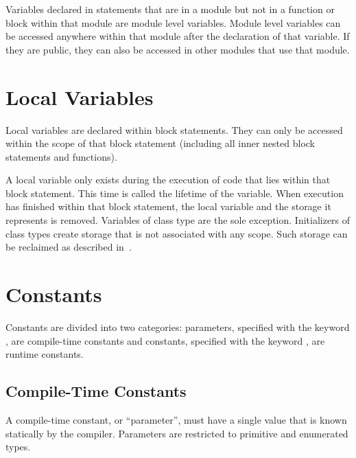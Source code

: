 Variables declared in statements that are in a module but not in a
function or block within that module are module level variables.
Module level variables can be accessed anywhere within that module
after the declaration of that variable.  If they are public, they can
also be accessed in other modules that use that module.

\section{Local Variables}
\label{Local_Variables}

Local variables are declared within block statements.  They can only
be accessed within the scope of that block statement (including all
inner nested block statements and functions).

A local variable only exists during the execution of code that lies
within that block statement.  This time is called the lifetime of the
variable.  When execution has finished within that block statement,
the local variable and the storage it represents is removed.
Variables of class type are the sole exception.  Initializers of class
types create storage that is not associated with any scope.  Such
storage can be reclaimed as described
in~.

\section{Constants}
\label{Constants}

Constants are divided into two categories: parameters, specified with
the keyword , are compile-time constants and constants,
specified with the keyword , are runtime constants.

\subsection{Compile-Time Constants}
\label{Compile-Time_Constants}

A compile-time constant, or ``parameter'', must have a single value that is
known statically by the compiler.  Parameters are restricted to
primitive and enumerated types.

